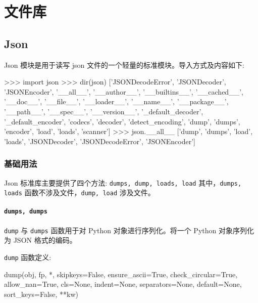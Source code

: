 \chapter{文件库}
\section{Json}

Json 模块是用于读写 json 文件的一个轻量的标准模块。导入方式及内容如下:

\begin{python}
>>> import json
>>> dir(json)
['JSONDecodeError', 'JSONDecoder', 'JSONEncoder', '__all__', '__author__', '__builtins__', '__cached__', '__doc__', '__file__', '__loader__', '__name__', '__package__', '__path__', '__spec__', '__version__', '_default_decoder', '_default_encoder', 'codecs', 'decoder', 'detect_encoding', 'dump', 'dumps', 'encoder', 'load', 'loads', 'scanner']
>>> json.__all__
['dump', 'dumps', 'load', 'loads', 'JSONDecoder', 'JSONDecodeError', 'JSONEncoder']
\end{python}

\subsection{基础用法}

Json 标准库主要提供了四个方法: \texttt{dumps, dump, loads, load} 其中，\texttt{dumps, loads} 函数不涉及文件，\texttt{dump, load} 涉及文件。

\subsubsection{\texttt{dumps, dumps}}

\texttt{dump} 与 \texttt{dumps} 函数用于对 Python 对象进行序列化。将一个 Python 对象序列化为 JSON 格式的编码。

\texttt{dump} 函数定义:
\begin{python}
dump(obj, fp, *, skipkeys=False, ensure_ascii=True, check_circular=True, allow_nan=True, cls=None, indent=None, separators=None, default=None, sort_keys=False, **kw)
\end{python}


